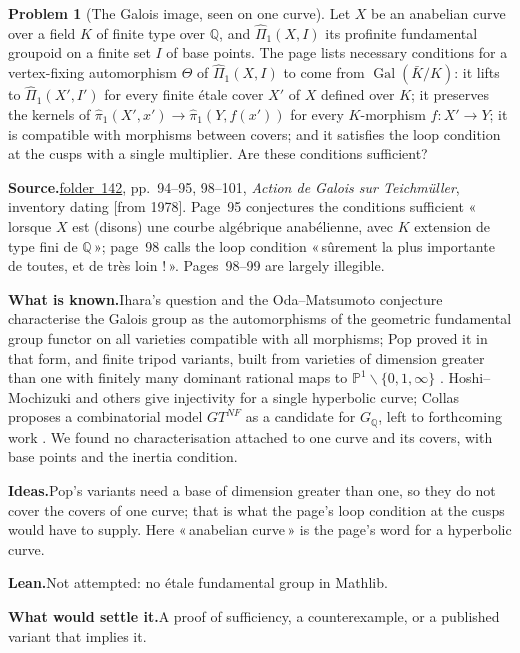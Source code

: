 \documentclass[11pt]{article}
\newcommand{\q}[1]{«\,#1\,»}
\newcommand{\fac}[1]{\href{https://grothendieck.umontpellier.fr/#1.pdf}{folder~#1}}
\newcommand{\Gal}{\operatorname{Gal}}
\theoremstyle{definition}
\newtheorem{problem}{Problem}
\theoremstyle{plain}\newtheorem*{proposition}{Proposition}\theoremstyle{definition}
\newcommand{\entry}[1]{\par\medskip\noindent\textbf{#1}\enspace}
\newcommand{\src}[1]{\entry{Source.}#1}
\newcommand{\known}{\entry{What is known.}}
\newcommand{\ideas}{\entry{Ideas.}}
\newcommand{\leanst}{\entry{Lean.}}
\newcommand{\settle}{\entry{What would settle it.}}
\begin{document}
\begin{problem}[The Galois image, seen on one curve]\label{p:gal}
Let $X$ be an anabelian curve over a field $K$ of finite type over $\mathbb Q$, and $\hat\Pi_1(X, I)$ its profinite fundamental groupoid on a finite set $I$ of base points. The page lists necessary conditions for a vertex-fixing automorphism $\Theta$ of $\hat\Pi_1(X, I)$ to come from $\Gal(\bar K/K)$: it lifts to $\hat\Pi_1(X', I')$ for every finite étale cover $X'$ of $X$ defined over $K$; it preserves the kernels of $\hat\pi_1(X', x') \to \hat\pi_1(Y, f(x'))$ for every $K$-morphism $f : X' \to Y$; it is compatible with morphisms between covers; and it satisfies the loop condition at the cusps with a single multiplier. Are these conditions sufficient?
\end{problem}

\src{\fac{142}, pp.~94--95, 98--101, \emph{Action de Galois sur Teichmüller}, inventory dating [from 1978]. Page~95 conjectures the conditions sufficient \q{lorsque $X$ est (disons) une courbe algébrique anabélienne, avec $K$ extension de type fini de $\mathbb Q$}; page~98 calls the loop condition \q{sûrement la plus importante de toutes, et de très loin !}. Pages~98--99 are largely illegible.}

\known Ihara's question and the Oda--Matsumoto conjecture characterise the Galois group as the automorphisms of the geometric fundamental group functor on all varieties compatible with all morphisms; Pop proved it in that form, and finite tripod variants, built from varieties of dimension greater than one with finitely many dominant rational maps to $\mathbb P^1 \smallsetminus \{0,1,\infty\}$ \cite[Def.~2.2, Th.~2.9]{pop2019}. Hoshi--Mochizuki and others give injectivity for a single hyperbolic curve; Collas proposes a combinatorial model $GT^{NF}$ as a candidate for $G_{\mathbb Q}$, left to forthcoming work \cite[\S4.3.3]{collas}. We found no characterisation attached to one curve and its covers, with base points and the inertia condition.

\ideas Pop's variants need a base of dimension greater than one, so they do not cover the covers of one curve; that is what the page's loop condition at the cusps would have to supply. Here \q{anabelian curve} is the page's word for a hyperbolic curve.

\leanst Not attempted: no étale fundamental group in Mathlib.

\settle A proof of sufficiency, a counterexample, or a published variant that implies it.
\end{document}
